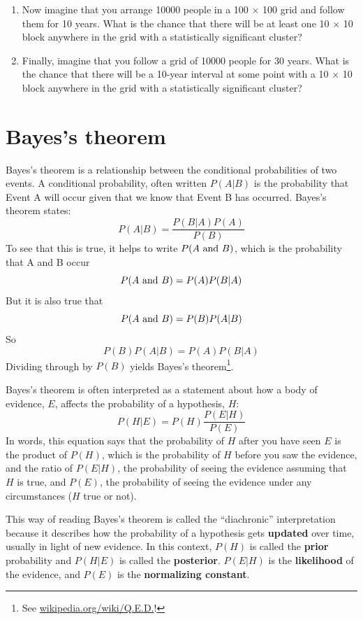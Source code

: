 \documentclass[12pt]{book}
\begin{document}
\begin{ex}
\begin{enumerate}
\item Now imagine that you arrange 10000 people in a 100 $\times$ 100
  grid and follow them for 10 years.  What is the chance that there
  will be at least one 10 $\times$ 10 block anywhere in the grid
  with a statistically significant cluster?

\item Finally, imagine that you follow a grid of 10000 people for 30
  years.  What is the chance that there will be a 10-year interval
  at some point with a 10 $\times$ 10 block anywhere in the grid
  with a statistically significant cluster?

\end{enumerate}

\end{ex}



\section{Bayes's theorem}

Bayes's theorem is a relationship between the conditional probabilities
of two events.  A conditional probability, often written $P(A|B)$ is
the probability that Event A will occur given that we know that
Event B has occurred.  Bayes's theorem states:
%
\[ P(A|B) = \frac{P(B|A)P(A)}{P(B)} \]
%
To see that this is true, it helps to write $P(A ~\mbox{and}~ B)$, which
is the probability that A and B occur
%
\[ P(A ~\mbox{and}~ B) = P(A) P(B|A) \]
%
But it is also true that 
%
\[ P(A ~\mbox{and}~ B) = P(B) P(A|B) \]
%
So
%
\[ P(B) P(A|B) = P(A) P(B|A) \]
%
Dividing through by $P(B)$ yields Bayes's theorem\footnote{See
\url{wikipedia.org/wiki/Q.E.D.}!}.


Bayes's theorem is often interpreted as a statement about 
how a body of evidence, $E$, affects the probability of a 
hypothesis, $H$:
%
\[ P(H|E) = P(H) \frac{P(E|H)}{P(E)} \]
%
In words, this equation says that the probability of $H$ after you
have seen $E$ is the product of $P(H)$, which is the probability of
$H$ before you saw the evidence, and the ratio of $P(E|H)$, the
probability of seeing the evidence assuming that $H$ is true, and
$P(E)$, the probability of seeing the evidence under any circumstances
($H$ true or not).

This way of reading Bayes's theorem is called the ``diachronic''
interpretation because it describes how the probability of a
hypothesis gets {\bf updated} over time, usually in light of new
evidence.  In this context, $P(H)$ is called the {\bf prior}
probability and $P(H|E)$ is called the {\bf posterior}.
$P(E|H)$ is the {\bf likelihood} of the evidence, and
$P(E)$ is the {\bf normalizing constant}.
\end{document}
